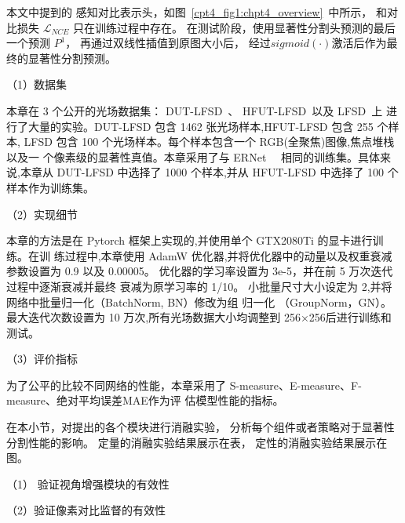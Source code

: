 %
%





% 
% 
% 
% 



本文中提到的
感知对比表示头，如图~\ref{cpt4_fig1:chpt4_overview}~中所示，
和对比损失 $\mathcal{L}_{NCE}$
只在训练过程中存在。
在测试阶段，使用显著性分割头预测的最后一个预测 $P^{1}$， 再通过双线性插值到原图大小后，
经过$sigmoid(\cdot)$激活后作为最终的显著性分割预测。





（1）数据集

本章在 3 个公开的光场数据集：
DUT-LFSD~\cite{zhang2019memory}、
HFUT-LFSD~\cite{zhang2017saliency}以及 
LFSD~\cite{li2014saliency}上
进行了大量的实验。DUT-LFSD 包含 1462 张光场样本,HFUT-LFSD 包含 255 个样本,
LFSD 包含 100 个光场样本。每个样本包含一个 RGB(全聚焦)图像,焦点堆栈以及一
个像素级的显著性真值。本章采用了与 ERNet~\cite{piao2020exploit}~ 相同的训练集。具体来说,本章从
DUT-LFSD 中选择了 1000 个样本,并从 HFUT-LFSD 中选择了 100 个样本作为训练集。

（2）实现细节

本章的方法是在 Pytorch 框架上实现的,并使用单个 GTX2080Ti 的显卡进行训练。在训
练过程中,本章使用 AdamW 优化器,并将优化器中的动量以及权重衰减参数设置为 0.9
以及 0.00005。
优化器的学习率设置为 3e-5，并在前 5 万次迭代过程中逐渐衰减并最终
衰减为原学习率的 1/10。
小批量尺寸大小设定为 2,并将网络中批量归一化（BatchNorm, BN）修改为组
归一化 （GroupNorm，GN）。
最大迭代次数设置为 10 万次,所有光场数据大小均调整到 256×256后进行训练和测试。

（3）评价指标

为了公平的比较不同网络的性能，本章采用了 S-measure、E-measure、F-measure、绝对平均误差MAE作为评
估模型性能的指标。


在本小节，对提出的各个模块进行消融实验，
分析每个组件或者策略对于显著性分割性能的影响。
定量的消融实验结果展示在表，
定性的消融实验结果展示在图。

（1）
验证视角增强模块的有效性




（2）验证像素对比监督的有效性






